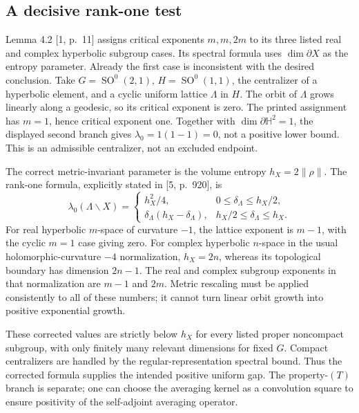 \documentclass[10pt]{article}
\begin{document}
\subsection*{A decisive rank-one test}
Lemma 4.2 [1, p. 11] assigns critical exponents \(m,m,2m\) to its three listed real and complex hyperbolic subgroup cases. Its spectral formula uses \(\dim\partial X\) as the entropy parameter. Already the first case is inconsistent with the desired conclusion. Take \(G=\operatorname{SO}^0(2,1)\), \(H=\operatorname{SO}^0(1,1)\), the centralizer of a hyperbolic element, and a cyclic uniform lattice \(\Lambda\) in \(H\). The orbit of \(\Lambda\) grows linearly along a geodesic, so its critical exponent is zero. The printed assignment has \(m=1\), hence critical exponent one. Together with \(\dim\partial\mathbb H^2=1\), the displayed second branch gives \(\lambda_0=1(1-1)=0\), not a positive lower bound. This is an admissible centralizer, not an excluded endpoint.\par
The correct metric-invariant parameter is the volume entropy \(h_X=2\|\rho\|\). The rank-one formula, explicitly stated in [5, p. 920], is \[\lambda_0(\Lambda\backslash X)=
 \begin{cases}
 h_X^2/4,&0\le\delta_\Lambda\le h_X/2,\\
 \delta_\Lambda(h_X-\delta_\Lambda),&h_X/2\le\delta_\Lambda\le h_X .
 \end{cases}
 \tag{3.1}\] For real hyperbolic \(m\)-space of curvature \(-1\), the lattice exponent is \(m-1\), with the cyclic \(m=1\) case giving zero. For complex hyperbolic \(n\)-space in the usual holomorphic-curvature \(-4\) normalization, \(h_X=2n\), whereas its topological boundary has dimension \(2n-1\). The real and complex subgroup exponents in that normalization are \(m-1\) and \(2m\). Metric rescaling must be applied consistently to all of these numbers; it cannot turn linear orbit growth into positive exponential growth.\par
These corrected values are strictly below \(h_X\) for every listed proper noncompact subgroup, with only finitely many relevant dimensions for fixed \(G\). Compact centralizers are handled by the regular-representation spectral bound. Thus the corrected formula supplies the intended positive uniform gap. The property-\((T)\) branch is separate; one can choose the averaging kernel as a convolution square to ensure positivity of the self-adjoint averaging operator.\par
\end{document}
